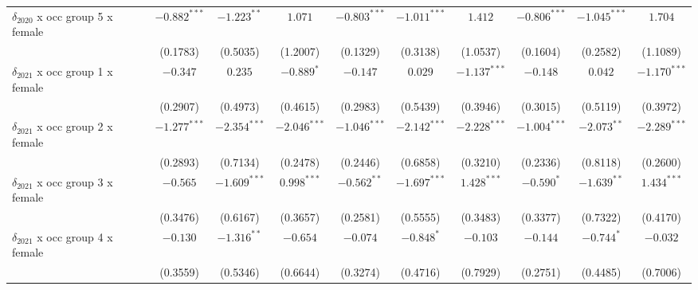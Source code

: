 \begin{tabular}{l|ccc|ccc|ccc|}
$\delta_{2020}$ x occ group 5 x female &          $-0.882^{***}$ &   $-1.223^{**}$ &         $1.071$ &           $-0.803^{***}$ &  $-1.011^{***}$ &         $1.412$ &           $-0.806^{***}$ &  $-1.045^{***}$ &         $1.704$ \\
                                       &                (0.1783) &        (0.5035) &        (1.2007) &                 (0.1329) &        (0.3138) &        (1.0537) &                 (0.1604) &        (0.2582) &        (1.1089) \\
$\delta_{2021}$ x occ group 1 x female &                $-0.347$ &         $0.235$ &      $-0.889^*$ &                 $-0.147$ &         $0.029$ &  $-1.137^{***}$ &                 $-0.148$ &         $0.042$ &  $-1.170^{***}$ \\
                                       &                (0.2907) &        (0.4973) &        (0.4615) &                 (0.2983) &        (0.5439) &        (0.3946) &                 (0.3015) &        (0.5119) &        (0.3972) \\
$\delta_{2021}$ x occ group 2 x female &          $-1.277^{***}$ &  $-2.354^{***}$ &  $-2.046^{***}$ &           $-1.046^{***}$ &  $-2.142^{***}$ &  $-2.228^{***}$ &           $-1.004^{***}$ &   $-2.073^{**}$ &  $-2.289^{***}$ \\
                                       &                (0.2893) &        (0.7134) &        (0.2478) &                 (0.2446) &        (0.6858) &        (0.3210) &                 (0.2336) &        (0.8118) &        (0.2600) \\
$\delta_{2021}$ x occ group 3 x female &                $-0.565$ &  $-1.609^{***}$ &   $0.998^{***}$ &            $-0.562^{**}$ &  $-1.697^{***}$ &   $1.428^{***}$ &               $-0.590^*$ &   $-1.639^{**}$ &   $1.434^{***}$ \\
                                       &                (0.3476) &        (0.6167) &        (0.3657) &                 (0.2581) &        (0.5555) &        (0.3483) &                 (0.3377) &        (0.7322) &        (0.4170) \\
$\delta_{2021}$ x occ group 4 x female &                $-0.130$ &   $-1.316^{**}$ &        $-0.654$ &                 $-0.074$ &      $-0.848^*$ &        $-0.103$ &                 $-0.144$ &      $-0.744^*$ &        $-0.032$ \\
                                       &                (0.3559) &        (0.5346) &        (0.6644) &                 (0.3274) &        (0.4716) &        (0.7929) &                 (0.2751) &        (0.4485) &        (0.7006) \\

\end{tabular}

